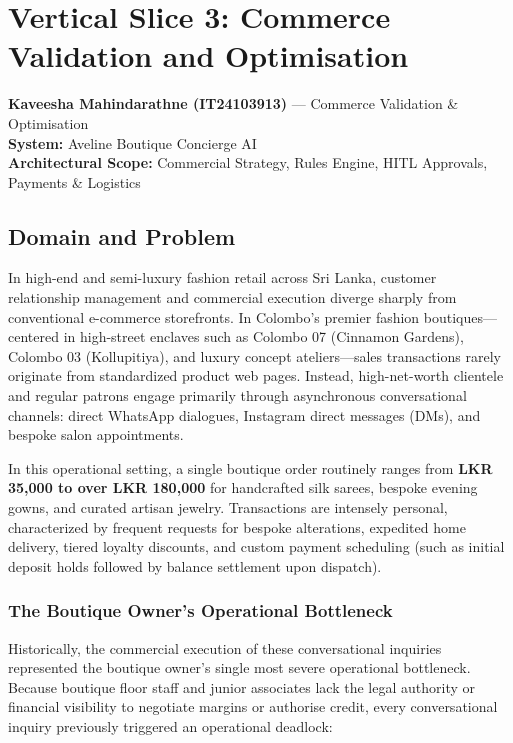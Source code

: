 \chapter{Vertical Slice 3: Commerce Validation and Optimisation}
\label{ch:slice-commerce}

\begin{tcolorbox}[colback=purple!5!white,colframe=purple!75!black,title=Slice Owner]
\textbf{Kaveesha Mahindarathne (IT24103913)} --- Commerce Validation \& Optimisation \\
\textbf{System:} Aveline Boutique Concierge AI \\
\textbf{Architectural Scope:} Commercial Strategy, Rules Engine, HITL Approvals, Payments \& Logistics
\end{tcolorbox}

\section{Domain and Problem}
\label{sec:c-domain}

In high-end and semi-luxury fashion retail across Sri Lanka, customer relationship management and commercial execution diverge sharply from conventional e-commerce storefronts. In Colombo's premier fashion boutiques---centered in high-street enclaves such as Colombo 07 (Cinnamon Gardens), Colombo 03 (Kollupitiya), and luxury concept ateliers---sales transactions rarely originate from standardized product web pages. Instead, high-net-worth clientele and regular patrons engage primarily through asynchronous conversational channels: direct WhatsApp dialogues, Instagram direct messages (DMs), and bespoke salon appointments. 

In this operational setting, a single boutique order routinely ranges from \textbf{LKR 35,000 to over LKR 180,000} for handcrafted silk sarees, bespoke evening gowns, and curated artisan jewelry. Transactions are intensely personal, characterized by frequent requests for bespoke alterations, expedited home delivery, tiered loyalty discounts, and custom payment scheduling (such as initial deposit holds followed by balance settlement upon dispatch).

\subsection{The Boutique Owner's Operational Bottleneck}

Historically, the commercial execution of these conversational inquiries represented the boutique owner's single most severe operational bottleneck. Because boutique floor staff and junior associates lack the legal authority or financial visibility to negotiate margins or authorise credit, every conversational inquiry previously triggered an operational deadlock:

